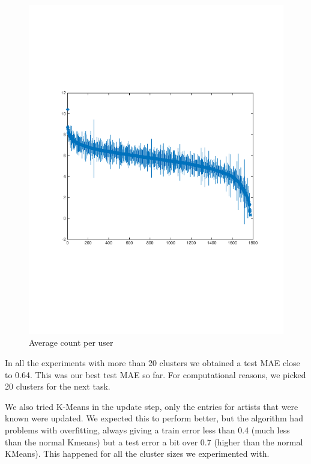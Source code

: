 \begin{figure}[h]
\begin{minipage}[b]{0.45\textwidth}
    \includegraphics[clip, trim=2cm 6.8cm 1.5cm 7cm, width=\textwidth]{figures/MeanStdCountPerUser.pdf}
    \caption{Average count per user}
    \label{fig:MeanStdCountPerUser}
    \vspace{2 mm}
  \end{minipage}
\end{figure}

In all the experiments with more than 20 clusters we obtained a test MAE close to 0.64. This was our best test MAE so far. For computational reasons, we picked 20 clusters for the next task.

We also tried K-Means in the update step, only the entries for artists that were known were updated. We expected this to perform better, but the algorithm had problems with overfitting, always giving a train error less than 0.4 (much less than the normal Kmeans) but a test error a bit over 0.7 (higher than the normal KMeans). This happened for all the cluster sizes we experimented with.

